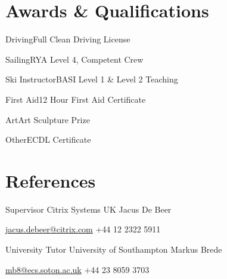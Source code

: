 \documentclass{tccv}
\begin{document}

\section{Awards \& Qualifications}

\begin{factlist}
\item{Driving}{Full Clean Driving License}
\item{Sailing}{RYA Level 4, Competent Crew}
\item{Ski Instructor}{BASI Level 1 \& Level 2 Teaching}
\item{First Aid}{12 Hour First Aid Certificate}
\item{Art}{Art Sculpture Prize}
\item{Other}{ECDL Certificate}
\end{factlist}


\section{References}

\begin{eventlist}

\item{Supervisor}
     {Citrix Systems UK}
     {Jacus De Beer}

\href{mailto:jacus.debeer@citrix.com}{jacus.debeer@citrix.com}
\newline
+44 12 2322 5911

\bigskip


\item{University Tutor}
     {University of Southampton}
     {Markus Brede}

\href{mailto:mb8@ecs.soton.ac.uk}{mb8@ecs.soton.ac.uk}
\newline
+44 23 8059 3703

\end{eventlist}
\end{document}
